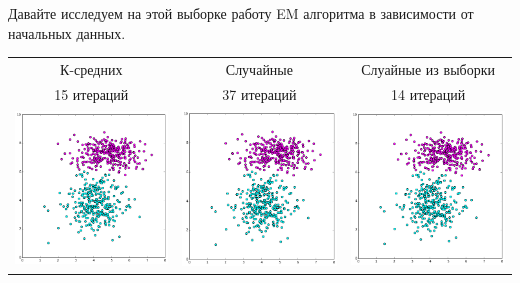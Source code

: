 \documentclass[12pt, a4paper]{article}
\begin{document}
			Давайте исследуем на этой выборке работу EM алгоритма в зависимости от начальных данных.

			\begin{center}
			\begin{tabular}{ c c c }
				\hline
				К-средних & Случайные & Слуайные из выборки \\

				15 итераций & 37 итераций & 14 итераций \\

				\hline

				\includegraphics[width=5cm]{4par_kminit_em.png} &
				\includegraphics[width=5cm]{4par_rdinit_EM.png} &
				\includegraphics[width=5cm]{4par_rdinitx_EM.png} \\


\end{tabular}
\end{center}
\end{document}
